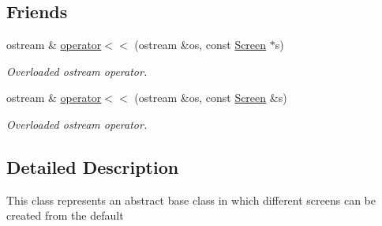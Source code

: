 \subsection*{Friends}
\begin{DoxyCompactItemize}
\item 
ostream \& \hyperlink{classScreen_a9d1583ec176b804e06d7c6d2a8bf3bcd}{operator$<$$<$} (ostream \&os, const \hyperlink{classScreen}{Screen} $\ast$s)
\begin{DoxyCompactList}\small\item\em Overloaded ostream operator. \end{DoxyCompactList}\item 
ostream \& \hyperlink{classScreen_adb701ccee14124fb66506086b5a34199}{operator$<$$<$} (ostream \&os, const \hyperlink{classScreen}{Screen} \&s)
\begin{DoxyCompactList}\small\item\em Overloaded ostream operator. \end{DoxyCompactList}\end{DoxyCompactItemize}


\subsection{Detailed Description}
This class represents an abstract base class in which different screens can be created from the default 

